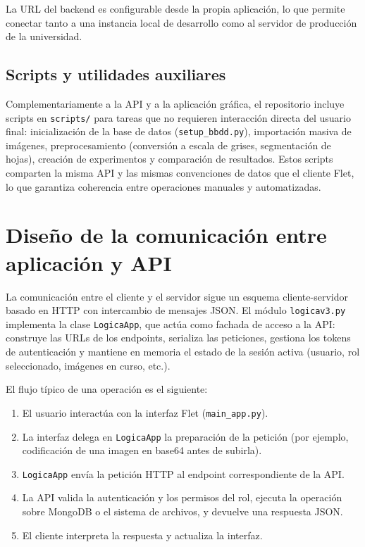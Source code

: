 \documentclass[11pt,spanish,listoffigures,listoftables]{tfgetsinf}
\begin{document}
La URL del backend es configurable desde la propia aplicación, lo que permite conectar tanto a una instancia local de desarrollo como al servidor de producción de la universidad.

\subsection{Scripts y utilidades auxiliares}

Complementariamente a la API y a la aplicación gráfica, el repositorio incluye scripts en \texttt{scripts/} para tareas que no requieren interacción directa del usuario final: inicialización de la base de datos (\texttt{setup\_bbdd.py}), importación masiva de imágenes, preprocesamiento (conversión a escala de grises, segmentación de hojas), creación de experimentos y comparación de resultados. Estos scripts comparten la misma API y las mismas convenciones de datos que el cliente Flet, lo que garantiza coherencia entre operaciones manuales y automatizadas.

\section{Diseño de la comunicación entre aplicación y API}

La comunicación entre el cliente y el servidor sigue un esquema cliente-servidor basado en HTTP con intercambio de mensajes JSON. El módulo \texttt{logicav3.py} implementa la clase \texttt{LogicaApp}, que actúa como fachada de acceso a la API: construye las URLs de los endpoints, serializa las peticiones, gestiona los tokens de autenticación y mantiene en memoria el estado de la sesión activa (usuario, rol seleccionado, imágenes en curso, etc.).

El flujo típico de una operación es el siguiente:

\begin{enumerate}
    \item El usuario interactúa con la interfaz Flet (\texttt{main\_app.py}).
    \item La interfaz delega en \texttt{LogicaApp} la preparación de la petición (por ejemplo, codificación de una imagen en base64 antes de subirla).
    \item \texttt{LogicaApp} envía la petición HTTP al endpoint correspondiente de la API.
    \item La API valida la autenticación y los permisos del rol, ejecuta la operación sobre MongoDB o el sistema de archivos, y devuelve una respuesta JSON.
    \item El cliente interpreta la respuesta y actualiza la interfaz.
\end{enumerate}
\end{document}
